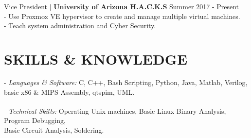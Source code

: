 \documentclass[line, 12pt]{res}
\newcommand\tab[1][0.5cm]{\hspace*{#1}}
\begin{document}
\begin{resume}
	Vice President $\mid$ \textbf{University of Arizona H.A.C.K.S} \hfill Summer 2017 - Present \\
		\tab - Use Proxmox VE hypervisor to create and manage multiple virtual machines. \\
		\tab - Teach system administration and Cyber Security.

\section{SKILLS \& KNOWLEDGE} 
	- {\sl Languages \& Software:} C, C++, Bash Scripting, Python, Java, Matlab, Verilog, \\ \tab[4.48cm] basic x86 \& MIPS Assembly, qtspim, UML. \\ \\
	- {\sl Technical Skills:} Operating Unix machines, Basic Linux Binary Analysis, Program Debugging, \\ \tab[3.25cm] Basic Circuit Analysis, Soldering.
 

\end{resume}
\end{document}
